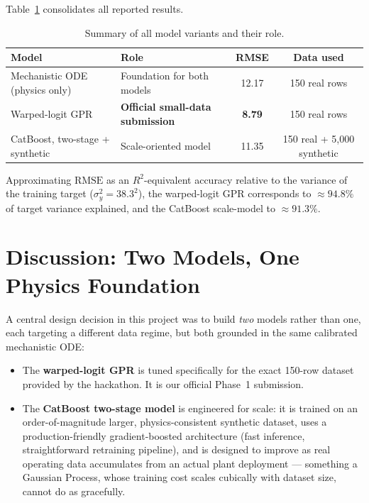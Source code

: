 \documentclass[11pt,a4paper]{article}
\newcommand{\rmse}{\text{RMSE}}
\begin{document}
Table~\ref{tab:summary} consolidates all reported results.

\begin{table}[h]
\centering
\caption{Summary of all model variants and their role.}
\label{tab:summary}
\begin{tabular}{p{4.2cm}p{3.7cm}cc}
\toprule
\textbf{Model} & \textbf{Role} & \textbf{RMSE} & \textbf{Data used} \\
\midrule
Mechanistic ODE (physics only) & Foundation for both models & 12.17 & 150 real rows \\
Warped-logit GPR & \textbf{Official small-data submission} & \textbf{8.79} & 150 real rows \\
CatBoost, two-stage + synthetic & Scale-oriented model & 11.35 & 150 real + 5{,}000 synthetic \\
\bottomrule
\end{tabular}
\end{table}

Approximating $\rmse$ as an $R^2$-equivalent accuracy relative to the variance of the training
target ($\sigma_y^2 = 38.3^2$), the warped-logit GPR corresponds to $\approx 94.8\%$ of target
variance explained, and the CatBoost scale-model to $\approx 91.3\%$.

\section{Discussion: Two Models, One Physics Foundation}

A central design decision in this project was to build \emph{two} models rather than one, each
targeting a different data regime, but both grounded in the same calibrated mechanistic ODE:

\begin{itemize}[nosep]
  \item The \textbf{warped-logit GPR} is tuned specifically for the exact 150-row dataset provided
  by the hackathon. It is our official Phase~1 submission.
  \item The \textbf{CatBoost two-stage model} is engineered for scale: it is trained on an
  order-of-magnitude larger, physics-consistent synthetic dataset, uses a production-friendly
  gradient-boosted architecture (fast inference, straightforward retraining pipeline), and is
  designed to improve as real operating data accumulates from an actual plant deployment ---
  something a Gaussian Process, whose training cost scales cubically with dataset size, cannot do
  as gracefully.
\end{itemize}
\end{document}
